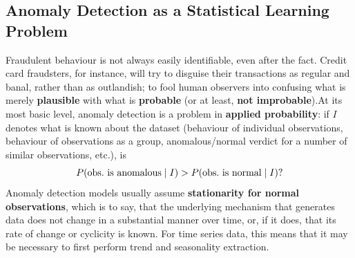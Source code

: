 \subsection{Anomaly Detection as a Statistical Learning Problem}
Fraudulent behaviour is not always easily identifiable, even after the fact. Credit card fraudsters, for instance, will try to disguise their transactions as regular and banal, rather than as outlandish; to fool human observers into confusing what is merely \textbf{plausible} with what is \textbf{probable} (or at least, \textbf{not improbable}).\newl At its most basic level, anomaly detection is a problem in \textbf{applied probability}: if $I$ denotes what is known about the dataset (behaviour of individual observations, behaviour of observations as a group, anomalous/normal verdict for a number of similar observations, etc.), is $$P(\text{obs.\@ is anomalous}\mid I) > P(\text{obs.\@ is normal}\mid I)?$$ 
Anomaly detection models usually assume \textbf{stationarity for normal observations}, which is to say, that the underlying mechanism that generates data does not change in a substantial manner over time, or, if it does, that its rate of change or cyclicity is known. \newl For time series data, this means that it may be necessary to first perform trend and seasonality extraction.
